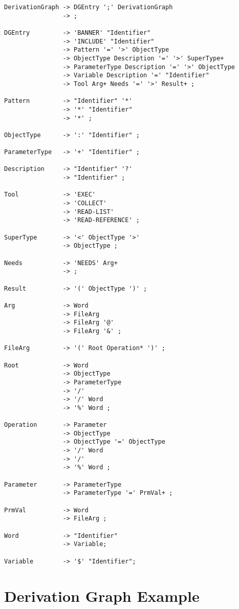 \begin{verbatim}
DerivationGraph -> DGEntry ';' DerivationGraph
                -> ;

DGEntry         -> 'BANNER' "Identifier"
                -> 'INCLUDE' "Identifier"
                -> Pattern '=' '>' ObjectType
                -> ObjectType Description '=' '>' SuperType+
                -> ParameterType Description '=' '>' ObjectType
                -> Variable Description '=' "Identifier"
                -> Tool Arg+ Needs '=' '>' Result+ ;

Pattern         -> "Identifier" '*'
                -> '*' "Identifier"
                -> '*' ;

ObjectType      -> ':' "Identifier" ;

ParameterType   -> '+' "Identifier" ;

Description     -> "Identifier" '?'
                -> "Identifier" ;

Tool            -> 'EXEC'
                -> 'COLLECT'
                -> 'READ-LIST'
                -> 'READ-REFERENCE' ;

SuperType       -> '<' ObjectType '>'
                -> ObjectType ;

Needs           -> 'NEEDS' Arg+
                -> ;

Result          -> '(' ObjectType ')' ;

Arg             -> Word
                -> FileArg
                -> FileArg '@'
                -> FileArg '&' ;

FileArg         -> '(' Root Operation* ')' ;

Root            -> Word
                -> ObjectType
                -> ParameterType
                -> '/'
                -> '/' Word
                -> '%' Word ;

Operation       -> Parameter
                -> ObjectType
                -> ObjectType '=' ObjectType
                -> '/' Word
                -> '/'
                -> '%' Word ;

Parameter       -> ParameterType
                -> ParameterType '=' PrmVal+ ;

PrmVal          -> Word
                -> FileArg ;

Word            -> "Identifier"
                -> Variable;

Variable        -> '$' "Identifier";
\end{verbatim}


\chapter{Derivation Graph Example}

